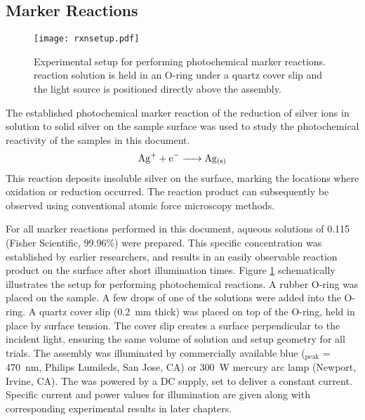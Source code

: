 \subsection{Marker Reactions}
\label{subsec:exp.markerreactions}

\begin{figure}
\begin{center}
\texttt{[image: rxnsetup.pdf]}
\caption[Experimental setup for marker reactions]{%
	Experimental setup for performing photochemical marker 
	reactions.  reaction solution is held in an 
	O-ring under a quartz cover slip and the light source 
	is positioned directly above the assembly.}
\label{fig:rxnsetup}
\end{center}
\end{figure}
The established photochemical marker reaction of the reduction of silver ions in solution to solid silver on the sample surface was used to study the photochemical reactivity of the samples in this document.
\begin{equation}
\ce{Ag+ + e- -> Ag_{(s)}}
\end{equation}
This reaction deposits insoluble silver on the surface, marking the locations where oxidation or reduction occurred.\cite{Giocondi:2001gz,Burbure:2010go,Giocondi:2001bi,Burbure:2010ti,Bhardwaj:2010eh,Giocondi:2008ja,Lowekamp:1998ks,MorrisHotsenpiller:1998jq} The reaction product can subsequently be observed using conventional atomic force microscopy methods.

For all marker reactions performed in this document, aqueous solutions of 0.115~\Molar {} (Fisher Scientific, 99.96\%) were prepared. This specific concentration was established by earlier researchers,\cite{Giocondi:2001gz,Burbure:2010go,Giocondi:2001bi,Burbure:2010ti,Bhardwaj:2010eh,Giocondi:2008ja,Lowekamp:1998ks,MorrisHotsenpiller:1998jq} and results in an easily observable reaction product on the surface after short illumination times.  Figure \ref{fig:rxnsetup} schematically illustrates the setup for performing photochemical reactions. A rubber O-ring was placed on the sample. A few drops of one of the solutions were added into the O-ring. A quartz cover slip (\SI{0.2}{\milli\meter} thick) was placed on top of the O-ring, held in place by surface tension. The cover slip creates a surface perpendicular to the incident light, ensuring the same volume of solution and setup geometry for all trials. The assembly was illuminated by commercially available blue  (\textlambda{}$_{\text{peak}}$ = \SI{470}{\nano\meter}, Philips Lumileds, San Jose, CA) or \SI{300}{\watt} mercury arc lamp (Newport, Irvine, CA). The  was powered by a DC supply, set to deliver a constant current. Specific current and power values for illumination are given along with corresponding experimental results in later chapters. 

